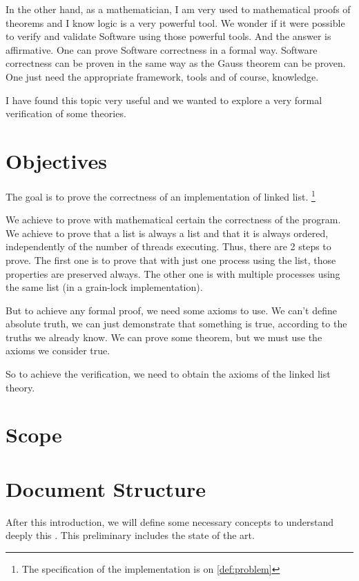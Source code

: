 In the other hand, as a mathematician, I am very used to mathematical proofs of theorems and I know logic is a very powerful tool.
%
We wonder if it were possible to verify and validate Software using those powerful tools.
%
And the answer is affirmative.
%
One can prove Software correctness in a formal way.
% 
Software correctness can be proven in the same way as the Gauss theorem can be proven.
%
One just need the appropriate framework, tools and of course, knowledge.


I have found this topic very useful and we wanted to explore a very formal verification of some theories.


\section{Objectives}

The goal is to prove the correctness of an implementation of linked list. \footnote{The specification of the implementation is on \ref{def:problem}}

We achieve to prove with mathematical certain the correctness of the program. We achieve to prove that a list is always a list and that it is always ordered, independently of the number of threads executing. Thus, there are 2 steps to prove. The first one is to prove that with just one process using the list, those properties are preserved always. The other one is with multiple processes using the same list (in a grain-lock implementation).

But to achieve any formal proof, we need some axioms to use.
We can't define absolute truth, we can just demonstrate that something is true, according to the truths we already know. 
We can prove some theorem, but we must use the axioms we consider true. 

So to achieve the verification, we need to obtain the axioms of the linked list theory.

\section{Scope}


\label{def:leap}

\section{Document Structure}

After this introduction, we will define some necessary concepts to understand deeply this \thisworkm. This preliminary includes the state of the art.


